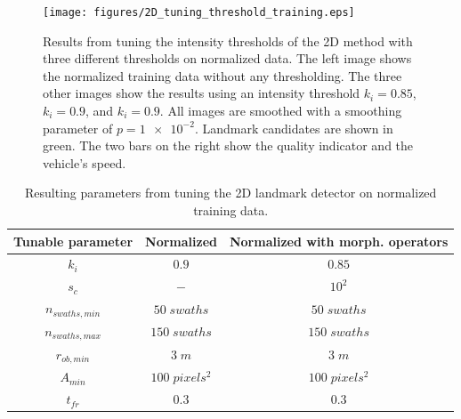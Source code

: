 \begin{figure}  %
  \centering
  \texttt{[image: figures/2D\_tuning\_threshold\_training.eps]}
  \caption[Results of tuning intensity threshold the 2D method]{Results from tuning the intensity thresholds of the 2D method with three different thresholds on normalized data. The left image shows the normalized training data without any thresholding. The three other images show the results using an intensity threshold $k_i = 0.85$, $k_i = 0.9$, and $k_i = 0.9$. All images are smoothed with a smoothing parameter of $p = \num{1e-2}$. Landmark candidates are shown in green. The two bars on the right show the quality indicator and the vehicle's speed.}
  \label{fig:2D_tuning_intensity_thres}
\end{figure}

\begin{table} 
    \caption{Resulting parameters from tuning the 2D landmark detector on normalized training data.}
    \centering
    \begin{tabular}{ccc}
        \hline
        \textbf{Tunable parameter} & \textbf{Normalized} & \textbf{Normalized with morph. operators} \\ \hline
        $k_i$                      & $0.9$               & $0.85$                                    \\
        $s_c$                      & $-$                 & $10^2$                                    \\
        $n_{swaths, min}$          & $50 \; swaths$      & $50 \; swaths$                            \\
        $n_{swaths, max}$          & $150\; swaths$      & $150 \; swaths$                           \\
        $r_{ob, min}$              & $3 \; m$            & $3 \; m$                                  \\ 
        $A_{min}$                  & $100 \; pixels^2$   & $100 \; pixels^2$                         \\
        $t_{fr}$                   & $0.3$               & $0.3$                                     \\ \hline
        
    \end{tabular}
    \label{tab:2D_parameters}
\end{table}

